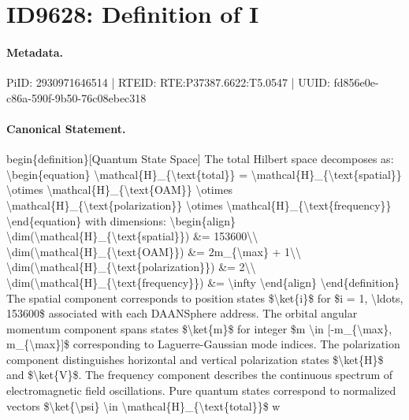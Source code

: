 \section*{ID9628: Definition of I}
\paragraph{Metadata.}
PiID: 2930971646514 | RTEID: RTE:P37387.6622:T5.0547 | UUID: fd856e0e-c86a-590f-9b50-76c08ebec318

\paragraph{Canonical Statement.}
begin\{definition\}[Quantum State Space] The total Hilbert space decomposes as: \textbackslash{}begin\{equation\} \textbackslash{}mathcal\{H\}\_\{\textbackslash{}text\{total\}\} = \textbackslash{}mathcal\{H\}\_\{\textbackslash{}text\{spatial\}\} \textbackslash{}otimes \textbackslash{}mathcal\{H\}\_\{\textbackslash{}text\{OAM\}\} \textbackslash{}otimes \textbackslash{}mathcal\{H\}\_\{\textbackslash{}text\{polarization\}\} \textbackslash{}otimes \textbackslash{}mathcal\{H\}\_\{\textbackslash{}text\{frequency\}\} \textbackslash{}end\{equation\} with dimensions: \textbackslash{}begin\{align\} \textbackslash{}dim(\textbackslash{}mathcal\{H\}\_\{\textbackslash{}text\{spatial\}\}) \&= 153600\textbackslash{}\textbackslash{} \textbackslash{}dim(\textbackslash{}mathcal\{H\}\_\{\textbackslash{}text\{OAM\}\}) \&= 2m\_\{\textbackslash{}max\} + 1\textbackslash{}\textbackslash{} \textbackslash{}dim(\textbackslash{}mathcal\{H\}\_\{\textbackslash{}text\{polarization\}\}) \&= 2\textbackslash{}\textbackslash{} \textbackslash{}dim(\textbackslash{}mathcal\{H\}\_\{\textbackslash{}text\{frequency\}\}) \&= \textbackslash{}infty \textbackslash{}end\{align\} \textbackslash{}end\{definition\} The spatial component corresponds to position states \$\textbackslash{}ket\{i\}\$ for \$i = 1, \textbackslash{}ldots, 153600\$ associated with each DAANSphere address. The orbital angular momentum component spans states \$\textbackslash{}ket\{m\}\$ for integer \$m \textbackslash{}in [-m\_\{\textbackslash{}max\}, m\_\{\textbackslash{}max\}]\$ corresponding to Laguerre-Gaussian mode indices. The polarization component distinguishes horizontal and vertical polarization states \$\textbackslash{}ket\{H\}\$ and \$\textbackslash{}ket\{V\}\$. The frequency component describes the continuous spectrum of electromagnetic field oscillations. Pure quantum states correspond to normalized vectors \$\textbackslash{}ket\{\textbackslash{}psi\} \textbackslash{}in \textbackslash{}mathcal\{H\}\_\{\textbackslash{}text\{total\}\}\$ w

